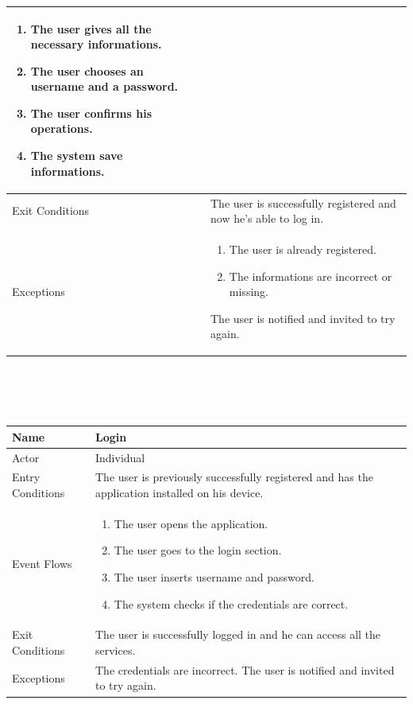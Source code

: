 \documentclass{article}
\begin{document}
\begin{legal}
\begin{legal}
\begin{legal}
\begin{tabular}{| m{3.5cm} | m{8cm}| }
\begin{enumerate}
									\item The user gives all the necessary informations.
									\item The user chooses an username and a password.
									\item The user confirms his operations.
									\item The system save informations.
				\end{enumerate}\\
				\hline
					Exit Conditions & The user is successfully  registered and now he's able to log in.\\
				\hline
					Exceptions & \begin{enumerate}
									  \item The user is already registered.
									  \item The informations are incorrect or
									   missing.
				\end{enumerate}
				The user is notified and invited to try again.\\
				\hline
				\end{tabular}
				\\\\\\
				\begin{tabular}{| m{3.5cm} | m{8cm}| }
				\hline
					Name & Login\\
				\hline
					Actor & Individual\\
				\hline
					Entry Conditions & The user is previously successfully registered and has the application installed
				on his device.\\
				\hline
					Event Flows & \begin{enumerate}
									  \item The user opens the application.
									  \item The user goes to the login section.
									  \item The user inserts username and password.
									  \item The system checks if the credentials are correct.
				\end{enumerate}\\
				\hline
					Exit Conditions & The user is successfully logged in and he can access all the services. \\
				\hline
					Exceptions & The credentials are incorrect. The user is notified and invited to try again.\\
				\hline
				\end{tabular}\\\\\\

\end{legal}
\end{legal}
\end{legal}
\end{document}
